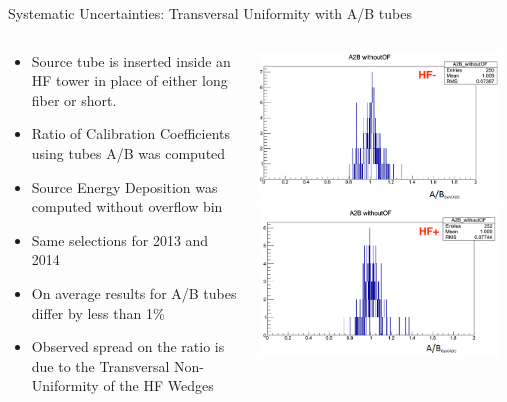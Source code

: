 \documentclass[pdf, 9pt]{beamer}
\begin{document}
    \begin{frame}{Systematic Uncertainties: Transversal Uniformity with A/B tubes}
    \begin{columns}[T]
      \begin{column}{0.6\textwidth}
        \begin{center}
        \begin{itemize}
            \item Source tube is inserted inside an HF tower in place of either long fiber or short.
            \item Ratio of Calibration Coefficients using tubes A/B was computed
            \item Source Energy Deposition was computed without overflow bin
            \item Same selections for 2013 and 2014
            \item On average results for A/B tubes differ by less than 1\%
            \item Observed spread on the ratio is due to the Transversal Non-Uniformity of the HF Wedges
        \end{itemize}
        \end{center}
      \end{column}
      \begin{column}{0.4\textwidth}
        \includegraphics[width=0.95\textwidth, height=0.4\textheight]{figs/sourcing/HFM_A2B_woOF.png}\\
        \includegraphics[width=0.95\textwidth, height=0.4\textheight]{figs/sourcing/HFP_A2B_woOF.png}
      \end{column}
    \end{columns}
  \end{frame}
\end{document}
